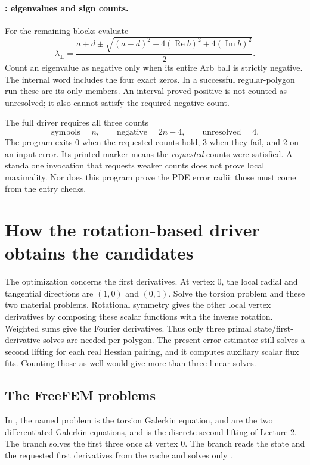 \paragraph{: eigenvalues and sign counts.}
For the remaining blocks evaluate
\[
 \lambda_\pm=
 \frac{a+d\pm\sqrt{(a-d)^2+4(\operatorname{Re}b)^2
                                  +4(\operatorname{Im}b)^2}}2.
\]
Count an eigenvalue as negative only when its entire Arb ball is strictly
negative. The internal word  includes the four exact
zeros. In a successful regular-polygon run these are its only members.
An interval proved positive is not counted as unresolved; it also cannot
satisfy the required negative count.

The full driver requires all three counts
\[
 \text{symbols}=n,\qquad \text{negative}=2n-4,
                  \qquad \text{unresolved}=4.
\]
The program exits $0$ when the requested counts hold, $3$ when they fail,
and $2$ on an input error. Its printed  marker means
the \emph{requested} counts were satisfied. A standalone invocation that
requests weaker counts does not prove local maximality. Nor does this
program prove the PDE error radii: those must come from the entry checks.

\section{How the rotation-based driver obtains the candidates}
\label{l3:driver}
The optimization concerns the first derivatives. At vertex $0$, the local
radial and tangential directions are $(1,0)$ and $(0,1)$. Solve the torsion
problem and these two material problems. Rotational symmetry gives the
other local vertex derivatives by composing these scalar functions with
the inverse rotation. Weighted sums give the Fourier derivatives.
Thus only three primal state/first-derivative solves are needed per polygon.
The present error estimator still solves a second lifting for each real
Hessian pairing, and it computes auxiliary scalar flux fits. Counting
those as well would give more than three linear solves.

\subsection{The FreeFEM problems}
In , the named problem
 is the torsion Galerkin equation,  and
 are the two differentiated Galerkin equations, and
 is the discrete second lifting of Lecture 2.
The  branch solves the first three once at vertex $0$.
The  branch reads the state and the requested first
derivatives from the cache and solves only .

